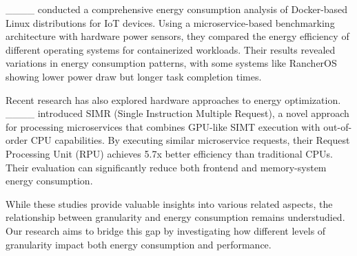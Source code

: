 ____ conducted a comprehensive energy consumption analysis of Docker-based Linux distributions for IoT devices.
Using a microservice-based benchmarking architecture with hardware power sensors, they compared the energy efficiency of different operating systems for containerized workloads.
Their results revealed variations in energy consumption patterns, with some systems like RancherOS showing lower power draw but longer task completion times. 

Recent research has also explored hardware approaches to energy optimization.
____ introduced SIMR (Single Instruction Multiple Request), a novel approach for processing microservices that combines GPU-like SIMT execution with out-of-order CPU capabilities.
By executing similar microservice requests, their Request Processing Unit (RPU) achieves 5.7x better efficiency than traditional CPUs.
Their evaluation can significantly reduce both frontend and memory-system energy consumption.

While these studies provide valuable insights into various related aspects, the relationship between granularity and energy consumption remains understudied.
Our research aims to bridge this gap by investigating how different levels of granularity impact both energy consumption and performance.